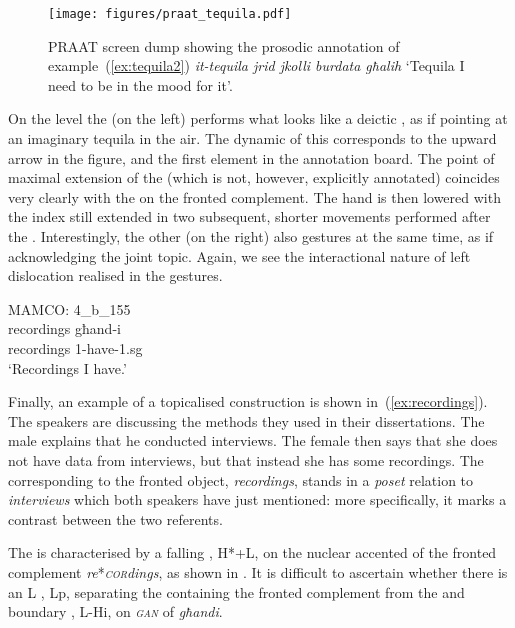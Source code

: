 \documentclass[output=paper]{LSP/langsci}
\begin{document}
\begin{figure}
\texttt{[image: figures/praat\_tequila.pdf]}
\caption{PRAAT screen dump showing the prosodic annotation of example~(\ref{ex:tequila2}) {\em it-tequila jrid jkolli burdata għalih} `Tequila I need to be in the mood for it'.}
\label{fig:praat_tequila}
\end{figure}


On the  level the  (on the left) performs what looks
like a deictic , as if pointing at an imaginary tequila in the
air.
The dynamic of this  corresponds to the upward arrow in the
figure, and the first  element in the annotation board. The
point of maximal extension of the  (which is not, however,
explicitly annotated) coincides very clearly with the  on
the fronted complement. The hand is then lowered with the index still
extended in two subsequent, shorter movements performed after the
 .  Interestingly, the other  (on
the right) also gestures at the same time, as if acknowledging the
joint topic. Again, we see the interactional nature of left
dislocation realised in the gestures.


\ea\label{ex:recordings}
{MAMCO: 4\_b\_155}\\
\gll recordings għand-i\\
     recordings 1-have-{\sc 1.sg}\\
\glt `Recordings I have.'
\z


Finally, an example of a topicalised construction is shown
in~(\ref{ex:recordings}). The speakers are discussing the methods they
used in their dissertations. The male  explains that he
conducted interviews. The female  then says that she does not
have data from interviews, but that instead she has some
recordings. The  corresponding to the fronted object, {\em
  recordings}, stands in a {\em poset} relation to {\em interviews}
which both speakers have just mentioned: more specifically, it marks a
contrast between the two referents.

The  is characterised by a falling , H*+L, on the
nuclear accented  of the fronted complement {\it re}*{\textit
  {\textsc{cor}}}{\it dings}, as shown in
. It is difficult to ascertain
whether there is an L , Lp, separating the 
containing the fronted complement from the  and boundary
, L-Hi, on {\textit{\textsc{g{\Ħ}an}}}
of {\it għandi}. 
\end{document}
